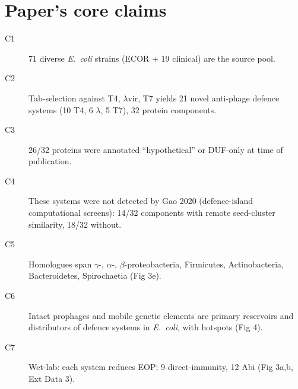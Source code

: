 \documentclass[11pt]{article}
\begin{document}
\section{Paper's core claims}
\begin{description}
  \item[C1] 71 diverse \emph{E.\ coli} strains (ECOR + 19 clinical) are the source pool.
  \item[C2] Tab-selection against T4, $\lambda$vir, T7 yields 21 novel anti-phage defence systems (10 T4, 6 $\lambda$, 5 T7), 32 protein components.
  \item[C3] 26/32 proteins were annotated ``hypothetical'' or DUF-only at time of publication.
  \item[C4] These systems were not detected by Gao 2020 (defence-island computational screens): 14/32 components with remote seed-cluster similarity, 18/32 without.
  \item[C5] Homologues span $\gamma$-, $\alpha$-, $\beta$-proteobacteria, Firmicutes, Actinobacteria, Bacteroidetes, Spirochaetia (Fig 3e).
  \item[C6] Intact prophages and mobile genetic elements are primary reservoirs and distributors of defence systems in \emph{E.\ coli}, with hotspots (Fig 4).
  \item[C7] Wet-lab: each system reduces EOP; 9 direct-immunity, 12 Abi (Fig 3a,b, Ext Data 3).
\end{description}
\end{document}
